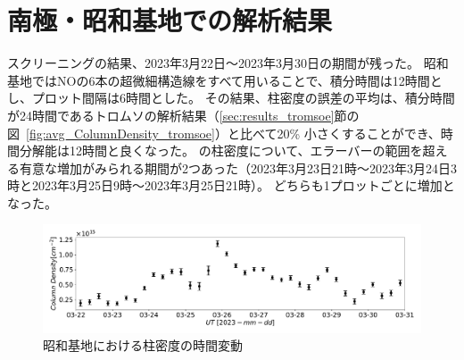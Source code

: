 \section{南極・昭和基地での解析結果}
\label{sec:results_syowa}
スクリーニングの結果、2023年3月22日〜2023年3月30日の期間が残った。
昭和基地ではNOの6本の超微細構造線をすべて用いることで、積分時間は12時間とし、プロット間隔は6時間とした。
その結果、柱密度の誤差の平均は、積分時間が24時間であるトロムソの解析結果（\ref{sec:results_tromsoe}節の図~\ref{fig:avg_ColumnDensity_tromsoe}）と比べて20\% 小さくすることができ、時間分解能は12時間と良くなった。
の柱密度について、エラーバーの範囲を超える有意な増加がみられる期間が2つあった（2023年3月23日21時〜2023年3月24日3時と2023年3月25日9時〜2023年3月25日21時）。
どちらも1プロットごとに増加となった。
\begin{figure}[htbp]
    \centering
    \includegraphics[width=\linewidth]{master_thesis_contents/master_thesis_fig/column_density_spectr6_syowa.pdf}
    \caption{昭和基地における柱密度の時間変動}
    \label{fig:column_density_spectr6_syowa}
\end{figure}
